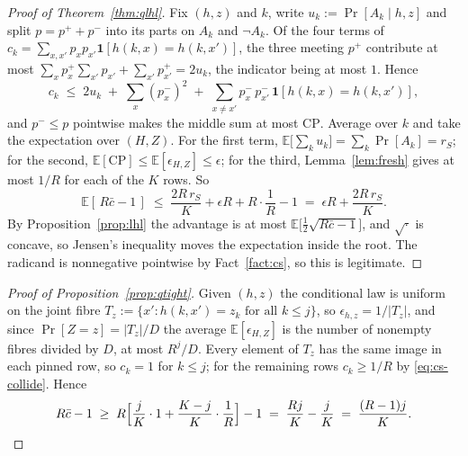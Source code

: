 \documentclass{aicr-solution}
\newcommand{\CP}{\mathrm{CP}}
\begin{document}
\begin{proof}[Proof of Theorem~\ref{thm:qlhl}]
Fix $(h,z)$ and $k$, write $u_k := \Pr[A_k \mid h,z]$ and split $p = p^{+} + p^{-}$ into its parts on
$A_k$ and $\neg A_k$. Of the four terms of $c_k = \sum_{x,x'}p_x p_{x'}\mathbf{1}[h(k,x)=h(k,x')]$,
the three meeting $p^{+}$ contribute at most
$\sum_x p^{+}_x \sum_{x'} p_{x'} + \sum_{x'} p^{+}_{x'} = 2u_k$, the indicator being at most $1$.
Hence
\[
  c_k \;\le\; 2u_k \;+\; \sum_{x}(p^{-}_{x})^2 \;+\;
    \sum_{x \neq x'} p^{-}_{x}\,p^{-}_{x'}\,\mathbf{1}[h(k,x)=h(k,x')] ,
\]
and $p^{-} \le p$ pointwise makes the middle sum at most $\CP$. Average over $k$ and take the expectation over $(H,Z)$. For the first term,
$\mathbb{E}\bigl[\sum_k u_k\bigr] = \sum_k \Pr[A_k] = r_S$; for the second,
$\mathbb{E}[\CP] \le \mathbb{E}[\epsilon_{H,Z}] \le \epsilon$; for the third,
Lemma~\ref{lem:fresh} gives at most $1/R$ for each of the $K$ rows. So
\[
  \mathbb{E}[\,R\bar c - 1\,] \;\le\; \frac{2R\,r_S}{K} + \epsilon R + R\cdot\frac1R - 1
  \;=\; \epsilon R + \frac{2R\,r_S}{K} .
\]
By Proposition~\ref{prop:lhl} the advantage is at most
$\mathbb{E}\bigl[\tfrac12\sqrt{R\bar c - 1}\bigr]$, and $\sqrt{\cdot}$ is concave, so Jensen's
inequality moves the expectation inside the root. The radicand is nonnegative pointwise by
Fact~\ref{fact:cs}, so this is legitimate.
\end{proof}
\begin{proof}[Proof of Proposition~\ref{prop:qtight}]
Given $(h,z)$ the conditional law is uniform on the joint fibre
$T_z := \{x' : h(k,x') = z_k \text{ for all } k \le j\}$, so $\epsilon_{h,z} = 1/|T_z|$, and since
$\Pr[Z = z] = |T_z|/D$ the average $\mathbb{E}[\epsilon_{H,Z}]$ is the number of nonempty fibres
divided by $D$, at most $R^{j}/D$. Every element of $T_z$ has the same image in each pinned row, so
$c_k = 1$ for $k \le j$; for the remaining rows $c_k \ge 1/R$ by \eqref{eq:cs-collide}. Hence
\[
  R\bar c - 1 \;\ge\; R\Bigl[\frac{j}{K}\cdot 1 + \frac{K-j}{K}\cdot\frac1R\Bigr] - 1
  \;=\; \frac{Rj}{K} - \frac{j}{K} \;=\; \frac{(R-1)j}{K} . \qedhere
\]
\end{proof}
\end{document}

